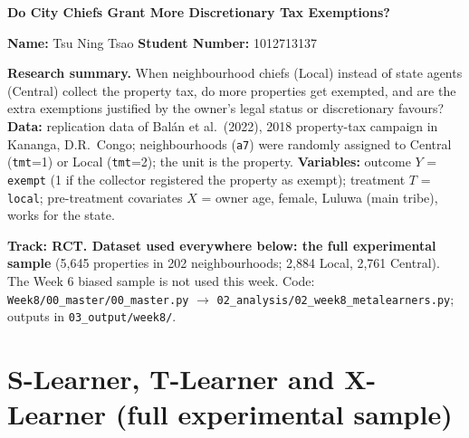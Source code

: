 \documentclass[11pt]{article}
\begin{document}
\begin{center}
{\Large\bfseries Do City Chiefs Grant More Discretionary Tax Exemptions?}

\vspace{4pt}
\textbf{Name:} Tsu Ning Tsao \quad \textbf{Student Number:} 1012713137
\end{center}

\textbf{Research summary.} When neighbourhood chiefs (Local) instead of state agents (Central) collect the property tax, do more properties get exempted, and are the extra exemptions justified by the owner's legal status or discretionary favours? \textbf{Data:} replication data of Bal\'an et al.\ (2022), 2018 property-tax campaign in Kananga, D.R.\ Congo; neighbourhoods (\texttt{a7}) were randomly assigned to Central (\texttt{tmt}=1) or Local (\texttt{tmt}=2); the unit is the property. \textbf{Variables:} outcome $Y$ = \texttt{exempt} (1 if the collector registered the property as exempt); treatment $T$ = \texttt{local}; pre-treatment covariates $X$ = owner age, female, Luluwa (main tribe), works for the state.

\textbf{Track: RCT. Dataset used everywhere below: the full experimental sample} (5,645 properties in 202 neighbourhoods; 2,884 Local, 2,761 Central). The Week 6 biased sample is not used this week. Code: \texttt{Week8/00\_master/00\_master.py} $\rightarrow$ \texttt{02\_analysis/02\_week8\_metalearners.py}; outputs in \texttt{03\_output/week8/}.

\section{S-Learner, T-Learner and X-Learner (full experimental sample)}
\end{document}
